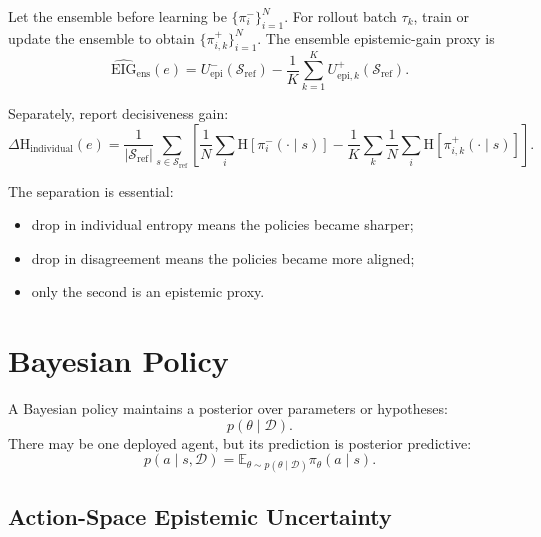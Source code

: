 \documentclass[11pt]{article}
\newcommand{\D}{\mathcal{D}}
\newcommand{\E}{\mathbb{E}}
\newcommand{\Sref}{\mathcal{S}_{\mathrm{ref}}}
\newcommand{\Hent}{\mathrm{H}}
\begin{document}
Let the ensemble before learning be $\{\pi_i^-\}_{i=1}^{N}$. For rollout batch
$\tau_k$, train or update the ensemble to obtain $\{\pi_{i,k}^+\}_{i=1}^{N}$.
The ensemble epistemic-gain proxy is
\begin{equation}
  \widehat{\mathrm{EIG}}_{\mathrm{ens}}(e)
  =
  U_{\mathrm{epi}}^-(\Sref)
  -
  \frac{1}{K}\sum_{k=1}^{K}
  U_{\mathrm{epi},k}^+(\Sref).
\end{equation}

Separately, report decisiveness gain:
\begin{equation}
  \Delta \Hent_{\mathrm{individual}}(e)
  =
  \frac{1}{|\Sref|}\sum_{s \in \Sref}
  \left[
  \frac{1}{N}\sum_i \Hent[\pi_i^-(\cdot \mid s)]
  -
  \frac{1}{K}\sum_k
  \frac{1}{N}\sum_i \Hent[\pi_{i,k}^+(\cdot \mid s)]
  \right].
\end{equation}

The separation is essential:
\begin{itemize}[leftmargin=*]
  \item drop in individual entropy means the policies became sharper;
  \item drop in disagreement means the policies became more aligned;
  \item only the second is an epistemic proxy.
\end{itemize}

\section{Bayesian Policy}

A Bayesian policy maintains a posterior over parameters or hypotheses:
\begin{equation}
  p(\theta \mid \D).
\end{equation}
There may be one deployed agent, but its prediction is posterior predictive:
\begin{equation}
  p(a \mid s,\D)
  =
  \E_{\theta \sim p(\theta \mid \D)}
  \pi_{\theta}(a \mid s).
\end{equation}

\subsection{Action-Space Epistemic Uncertainty}
\end{document}

